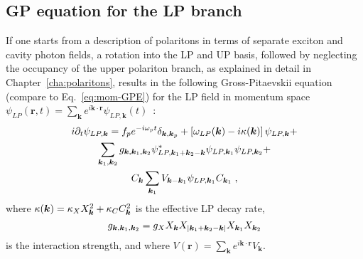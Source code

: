 \begin{subappendices}
\section{GP equation for the LP branch}
\label{app:full}
%
If one starts from a description of polaritons in terms of separate
exciton and cavity photon fields, a rotation into the LP and UP basis,
followed by neglecting the occupancy of the upper polariton branch, as
explained in detail in Chapter~\ref{cha:polaritons}, results in the
following Gross-Pitaevskii equation (compare to
Eq.~\eqref{eq:mom-GPE}) for the LP field in momentum space
$\psi_{LP}(\bm{r},t) = \sum_{\bm{k}} e^{i\bm{k}\cdot \bm{r}}
\psi_{LP,\bm{k}} (t)$~\cite{Ciuti_2003}:
%
\begin{multline}
  i\partial_t \psi_{LP,\bm{k}} = f_p e^{-i\omega_p t}
  \delta_{\bm{k},\bm{k}_p} + \left[\omega_{LP} (\kv) - i\kappa
    (\kv)\right]\psi_{LP,\bm{k}} +\\
%
  \sum_{\bm{k}_1, \bm{k}_2} g_{\bm{k}, \bm{k}_1, \bm{k}_2}
  \psi^*_{LP,\bm{k}_1 + \bm{k}_2-\bm{k}} \psi_{LP,\bm{k}_1}
  \psi_{LP,\bm{k}_2} +\\ C_{\kv} \sum_{\bm{k}_1} V_{\bm{k} -
    \bm{k}_1} \psi_{LP,\bm{k}_1} C_{\kv_1}\; ,
\end{multline}
%
where $\kappa(\bm{k})=\kappa_X X^2_{\bm{k}} + \kappa_C C^2_{\bm{k}}$ is the effective LP
decay rate,
%
\begin{equation}
  g_{\bm{k}, \bm{k}_1, \bm{k}_2}=g_X X_{\bm{k}}X_{|\bm{k}_1 + \bm{k}_2-\bm{k}|} X_{\bm{k}_1} X_{\bm{k}_2}
\end{equation}
%
is the interaction strength, and where
$V(\bm{r}) = \sum_{\bm{k}} e^{i\bm{k}\cdot \bm{r}} V_{\bm{k}}$.


\end{subappendices}
